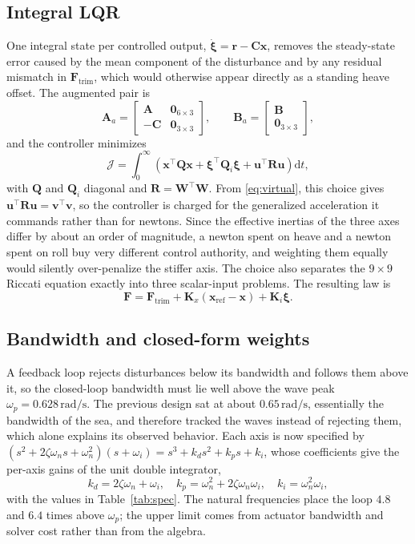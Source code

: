 \documentclass[]{IAC_style}
\newcommand{\W}{\bm{W}}
\newcommand{\Amat}{\bm{A}}
\newcommand{\Bmat}{\bm{B}}
\newcommand{\Cmat}{\bm{C}}
\newcommand{\Kmat}{\bm{K}}
\newcommand{\xv}{\bm{x}}
\newcommand{\uv}{\bm{u}}
\newcommand{\Fv}{\bm{F}}
\newcommand{\dd}{\mathrm{d}}
\newcommand{\un}[1]{\,\mathrm{#1}}
\begin{document}
\subsection{Integral LQR}
One integral state per controlled output, $\dot{\bm\xi}=\bm{r}-\Cmat\xv$, removes the steady-state error caused by the mean component of the disturbance and by any residual mismatch in $\Fv_\mathrm{trim}$, which would otherwise appear directly as a standing heave offset. The augmented pair is
\begin{equation}
\Amat_a=\begin{bmatrix}\Amat & \bm{0}_{6\times3}\\ -\Cmat & \bm{0}_{3\times3}\end{bmatrix},\qquad
\Bmat_a=\begin{bmatrix}\Bmat\\ \bm{0}_{3\times3}\end{bmatrix},
\label{eq:augment}
\end{equation}
and the controller minimizes \cite{anderson1990}
\begin{equation}
\mathcal{J}=\int_0^\infty\left(\xv^\top\bm{Q}\xv+\bm\xi^\top\bm{Q}_i\bm\xi+\uv^\top\bm{R}\uv\right)\dd t,
\label{eq:cost}
\end{equation}
with $\bm{Q}$ and $\bm{Q}_i$ diagonal and $\bm{R}=\W^\top\W$. From \eqref{eq:virtual}, this choice gives $\uv^\top\bm{R}\uv=\bm{v}^\top\bm{v}$, so the controller is charged for the generalized acceleration it commands rather than for newtons. Since the effective inertias of the three axes differ by about an order of magnitude, a newton spent on heave and a newton spent on roll buy very different control authority, and weighting them equally would silently over-penalize the stiffer axis. The choice also separates the $9\times9$ Riccati equation exactly into three scalar-input problems. The resulting law is
\begin{equation}
\Fv=\Fv_\mathrm{trim}+\Kmat_x(\xv_\mathrm{ref}-\xv)+\Kmat_i\bm\xi .
\label{eq:law}
\end{equation}

\subsection{Bandwidth and closed-form weights}
A feedback loop rejects disturbances below its bandwidth and follows them above it, so the closed-loop bandwidth must lie well above the wave peak $\omega_p=0.628\un{rad/s}$. The previous design sat at about $0.65\un{rad/s}$, essentially the bandwidth of the sea, and therefore tracked the waves instead of rejecting them, which alone explains its observed behavior. Each axis is now specified by $(s^2+2\zeta\omega_n s+\omega_n^2)(s+\omega_i)=s^3+k_ds^2+k_ps+k_i$, whose coefficients give the per-axis gains of the unit double integrator,
\begin{equation}
k_d=2\zeta\omega_n+\omega_i,\quad k_p=\omega_n^2+2\zeta\omega_n\omega_i,\quad k_i=\omega_n^2\omega_i,
\label{eq:kpkdki}
\end{equation}
with the values in Table~\ref{tab:spec}. The natural frequencies place the loop $4.8$ and $6.4$ times above $\omega_p$; the upper limit comes from actuator bandwidth and solver cost rather than from the algebra.
\end{document}
